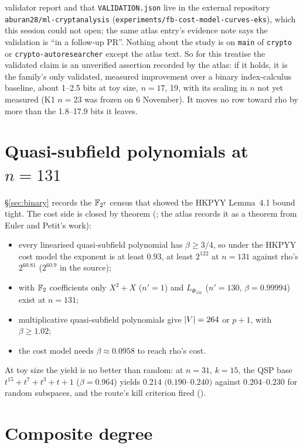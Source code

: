 validator report and that \texttt{VALIDATION.json} live in the external
repository \texttt{aburan28/ml-cryptanalysis}
(\texttt{experiments/fb-cost-model-curves-eks}), which this session could
not open; the same atlas entry's evidence note says the validation is ``in
a follow-up PR''. Nothing about the study is on \texttt{main} of
\texttt{crypto} or \texttt{crypto-autoresearcher} except the atlas text. So
for this treatise the validated claim is an unverified assertion recorded
by the atlas: if it holds, it is the family's only validated, measured
improvement over a binary index-calculus baseline, about 1--2.5 bits at toy
size, $n=17$, 19, with its scaling in $n$ not yet measured (K1 $n=23$ was
frozen on 6 November). It moves no row toward rho by more than the
1.8--17.9 bits it leaves.

\section{Quasi-subfield polynomials at $n=131$}\label{sec:bt-qsp}

\S\ref{sec:binary} records the $\mathbb{F}_{2^7}$ census that showed the HKPYY
Lemma~4.1 bound~\cite{hkyy2018} tight. The cost side is closed by theorem
(; the atlas
records it as a theorem from Euler and Petit's work):
\begin{itemize}
\item every linearised quasi-subfield polynomial has $\beta\ge3/4$, so under
  the HKPYY cost model the exponent is at least $0.93$, at least $2^{122}$ at
  $n=131$ against rho's $2^{60.81}$ ($2^{60.9}$ in the source);
\item with $\mathbb{F}_2$ coefficients only $X^2+X$ ($n'=1$) and $L_{\Phi_{131}}$
  ($n'=130$, $\beta=0.99994$) exist at $n=131$;
\item multiplicative quasi-subfield polynomials give $\lvert V \rvert=264$ or $p+1$,
  with $\beta\ge1.02$;
\item the cost model needs $\beta\approx0.0958$ to reach rho's cost.
\end{itemize}
At toy size the yield is no better than random: at $n=31$, $k=15$, the QSP
base $t^{15}+t^7+t^3+t+1$ ($\beta=0.964$) yields $0.214$ $(0.190$--$0.240)$
against $0.204$--$0.230$ for random subspaces, and the route's kill criterion
fired ().

\section{Composite degree}\label{sec:bt-composite}

